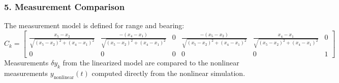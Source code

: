 \subsubsection*{5. Measurement Comparison}
The measurement model is defined for range and bearing:
\[
C_k = 
\begin{bmatrix}
\frac{x_5 - x_2}{\sqrt{(x_5 - x_2)^2 + (x_4 - x_1)^2}} & \frac{-(x_4 - x_1)}{\sqrt{(x_5 - x_2)^2 + (x_4 - x_1)^2}} & 0 & \frac{-(x_5 - x_2)}{\sqrt{(x_5 - x_2)^2 + (x_4 - x_1)^2}} & \frac{x_4 - x_1}{\sqrt{(x_5 - x_2)^2 + (x_4 - x_1)^2}} & 0 \\
0 & 0 & 0 & 0 & 0 & 1
\end{bmatrix}
\]
Measurements \( \delta y_k \) from the linearized model are compared to the nonlinear measurements \( y_{\text{nonlinear}}(t) \) computed directly from the nonlinear simulation.



